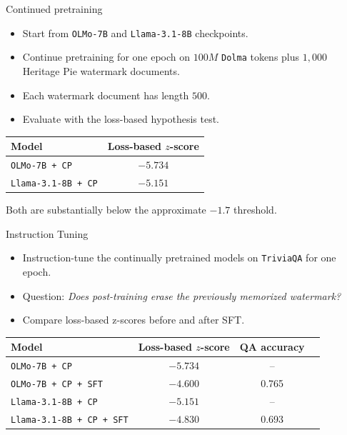 \documentclass[xcolor=dvipsnames,aspectratio=169]{beamer}
\begin{document}
	\begin{frame}{Continued pretraining}
		\begin{itemize}
			\item Start from \texttt{OLMo-7B} and \texttt{Llama-3.1-8B} checkpoints.
			\item Continue pretraining for one epoch on $100M$ \texttt{Dolma} tokens plus $1,000$ Heritage Pie watermark documents.
			\item Each watermark document has length $500$.
			\item Evaluate with the loss-based hypothesis test.
		\end{itemize}
		\begin{table}
			\centering
			\begin{tabular}{lc}
				\toprule
				\textbf{Model} & \textbf{Loss-based $z$-score} \\
				\midrule
				\texttt{OLMo-7B + CP} & $-5.734$ \\
				\midrule
				\texttt{Llama-3.1-8B + CP} & $-5.151$ \\
				\bottomrule
			\end{tabular}
		\end{table}
		Both are substantially below the approximate $-1.7$ threshold.
	\end{frame}
	
	\begin{frame}{Instruction Tuning}
		\begin{itemize}
			\item Instruction-tune the continually pretrained models on \texttt{TriviaQA} for one epoch.
			\item Question: \emph{Does post-training erase the previously memorized watermark?}
			\item Compare loss-based z-scores before and after SFT.
		\end{itemize}
		\begin{table}
			\centering
			\small
			\begin{tabular}{lccc}
				\toprule
				\textbf{Model} & \textbf{Loss-based $z$-score} & \textbf{QA accuracy} \\
				\midrule
				\texttt{OLMo-7B + CP}  & $-5.734$ & -- \\
				\texttt{OLMo-7B + CP + SFT}  & $-4.600$ & 0.765\\
				\texttt{Llama-3.1-8B + CP} & $-5.151$ & --\\
				\texttt{Llama-3.1-8B + CP + SFT} & $-4.830$ & 0.693\\
				\bottomrule
			\end{tabular}
		\end{table}
	\end{frame}
	
\end{document}
